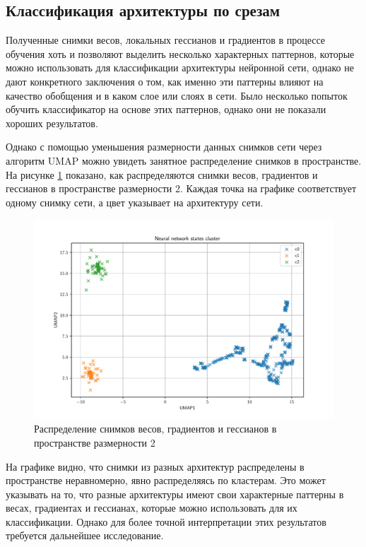 \documentclass[a4paper,12pt]{article}
\begin{document}
\subsection{Классификация архитектуры по срезам}

Полученные снимки весов, локальных гессианов и градиентов в процессе обучения хоть и позволяют выделить
несколько характерных паттернов, которые можно использовать для классификации архитектуры нейронной сети,
однако не дают конкретного заключения о том, как именно эти паттерны влияют на качество обобщения и в каком
слое или слоях в сети. Было несколько попыток обучить классификатор на основе этих паттернов, однако они не
показали хороших результатов.

Однако с помощью уменьшения размерности данных снимков сети через алгоритм UMAP можно увидеть занятное
распределение снимков в пространстве. На рисунке \ref{fig:umap} показано, как распределяются снимки весов,
градиентов и гессианов в пространстве размерности 2. Каждая точка на графике соответствует одному снимку
сети, а цвет указывает на архитектуру сети.
\begin{figure}[ht]
  \centering
  \includegraphics[width=1\linewidth]{umap.pdf}
  \caption{Распределение снимков весов, градиентов и гессианов в пространстве размерности 2}
  \label{fig:umap}
\end{figure}

На графике видно, что снимки из разных архитектур распределены в пространстве неравномерно, явно
распределяясь по кластерам. Это может указывать на то, что разные архитектуры имеют свои характерные паттерны
в весах, градиентах и гессианах, которые можно использовать для их классификации. Однако для более точной
интерпретации этих результатов требуется дальнейшее исследование.
\end{document}
